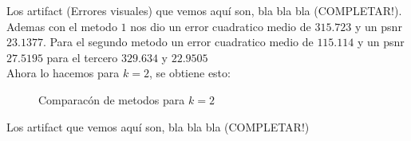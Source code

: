 Los artifact (Errores visuales) que vemos aquí son, bla bla bla (COMPLETAR!). Ademas con el metodo $1$ nos dio un error cuadratico medio de $315.723$ y un psnr $23.1377$. Para el segundo metodo un error cuadratico medio de $115.114$ y un psnr $27.5195$ para el tercero $329.634$ y $22.9505$
\\
Ahora lo hacemos para $k=2$, se obtiene esto:

\begin{figure}[H]
    \centering
    \qquad
    \qquad
    \caption{Comparacón de metodos para $k = 2$}%
    \label{fig:example}%
\end{figure}

Los artifact que vemos aquí son, bla bla bla (COMPLETAR!)


